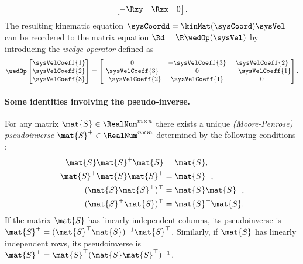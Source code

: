 \begin{Example}
\begin{align}
\begin{bmatrix}
  -\Rzy & \Rzx & 0
 \end{bmatrix}.
\end{align}
The resulting kinematic equation $\sysCoordd = \kinMat(\sysCoord) \sysVel$ can be reordered to the matrix equation $\Rd = \R \wedOp(\sysVel)$ by introducing the \textit{wedge operator} defined as
\begin{align}
 \wedOp \begin{bmatrix} \sysVelCoeff{1} \\ \sysVelCoeff{2} \\ \sysVelCoeff{3} \end{bmatrix} = \begin{bmatrix} 0 & -\sysVelCoeff{3} & \sysVelCoeff{2} \\ \sysVelCoeff{3} & 0 & -\sysVelCoeff{1} \\ -\sysVelCoeff{2} & \sysVelCoeff{1} & 0 \end{bmatrix}.
\end{align}
\end{Example}

\paragraph{Some identities involving the pseudo-inverse.}
For any matrix $\mat{S}\in\RealNum^{m\times n}$ there exists a unique \textit{(Moore-Penrose) pseudoinverse} $\mat{S}^+ \in \RealNum^{n\times m}$ determined by the following conditions \cite[Theo.\ 1]{Penrose:Pseudoinverse}:
\begin{subequations}\label{eq:PenroseConditions}
\begin{align}
 \mat{S} \mat{S}^+ \mat{S} &= \mat{S},
\\
 \mat{S}^+ \mat{S} \mat{S}^+ &= \mat{S}^+,
\\
 (\mat{S} \mat{S}^+)^\top &= \mat{S} \mat{S}^+,
\\
 (\mat{S}^+ \mat{S})^\top &= \mat{S}^+ \mat{S}.
\end{align}
\end{subequations}
If the matrix $\mat{S}$ has linearly independent columns, its pseudoinverse is $\mat{S}^+ = (\mat{S}^\top \mat{S})^{-1} \mat{S}^\top$.
Similarly, if $\mat{S}$ has linearly independent rows, its pseudoinverse is $\mat{S}^+ = \mat{S}^\top (\mat{S} \mat{S}^\top)^{-1}$.

